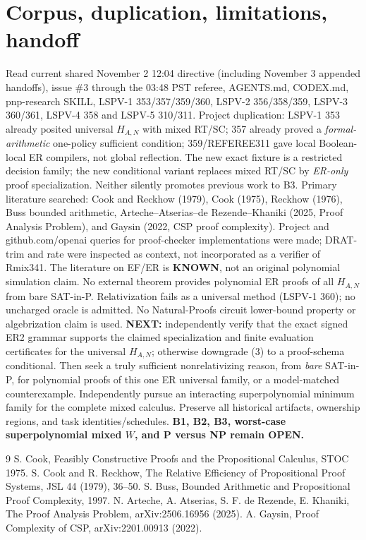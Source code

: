 \documentclass[11pt]{article}
\begin{document}
\section*{Corpus, duplication, limitations, handoff}
Read current shared November 2 12:04 directive (including November 3 appended handoffs), issue \#3 through the 03:48 PST referee, AGENTS.md, CODEX.md, pnp-research SKILL, LSPV-1 353/357/359/360, LSPV-2 356/358/359, LSPV-3 360/361, LSPV-4 358 and LSPV-5 310/311. Project duplication: LSPV-1 353 already posited universal $H_{A,N}$ with mixed RT/SC; 357 already proved a \emph{formal-arithmetic} one-policy sufficient condition; 359/REFEREE311 gave local Boolean-local ER compilers, not global reflection. The new exact fixture is a restricted decision family; the new conditional variant replaces mixed RT/SC by \emph{ER-only} proof specialization. Neither silently promotes previous work to B3.
Primary literature searched: Cook and Reckhow (1979), Cook (1975), Reckhow (1976), Buss bounded arithmetic, Arteche--Atserias--de Rezende--Khaniki (2025, Proof Analysis Problem), and Gaysin (2022, CSP proof complexity). Project and github.com/openai queries for proof-checker implementations were made; DRAT-trim and rate were inspected as context, not incorporated as a verifier of Rmix341. The literature on EF/ER is \textbf{KNOWN}, not an original polynomial simulation claim. No external theorem provides polynomial ER proofs of all $H_{A,N}$ from bare SAT-in-P. Relativization fails as a universal method (LSPV-1 360); no uncharged oracle is admitted. No Natural-Proofs circuit lower-bound property or algebrization claim is used.
\noindent\textbf{NEXT:} independently verify that the exact signed ER2 grammar supports the claimed specialization and finite evaluation certificates for the universal $H_{A,N}$; otherwise downgrade (3) to a proof-schema conditional. Then seek a truly sufficient nonrelativizing reason, from \emph{bare} SAT-in-P, for polynomial proofs of this one ER universal family, or a model-matched counterexample. Independently pursue an interacting superpolynomial minimum family for the complete mixed calculus. Preserve all historical artifacts, ownership regions, and task identities/schedules. \textbf{B1, B2, B3, worst-case superpolynomial mixed $W$, and P versus NP remain OPEN.}
\begin{thebibliography}{9}
 S. Cook, Feasibly Constructive Proofs and the Propositional Calculus, STOC 1975.
 S. Cook and R. Reckhow, The Relative Efficiency of Propositional Proof Systems, JSL 44 (1979), 36--50.
 S. Buss, Bounded Arithmetic and Propositional Proof Complexity, 1997.
 N. Arteche, A. Atserias, S. F. de Rezende, E. Khaniki, The Proof Analysis Problem, arXiv:2506.16956 (2025).
 A. Gaysin, Proof Complexity of CSP, arXiv:2201.00913 (2022).
\end{thebibliography}
\end{document}
